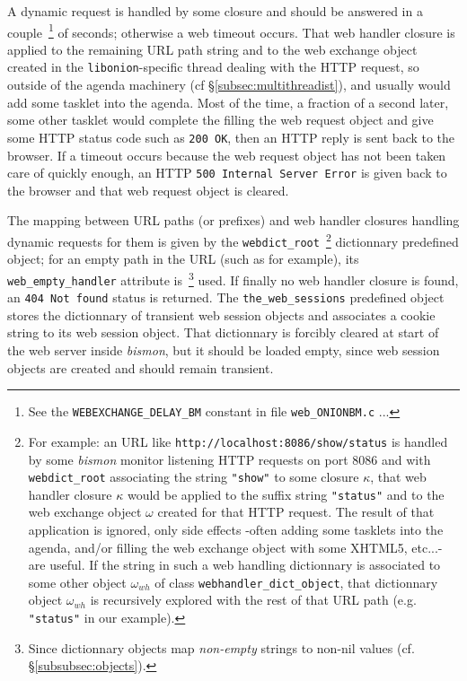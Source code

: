 A dynamic request is handled by some closure  and
should be answered in a couple~\footnote{See the
  \texttt{WEBEXCHANGE\_DELAY\_BM} constant in file
  \texttt{web\_ONIONBM.c} ...} of seconds; otherwise a  web timeout  occurs. That web handler
 closure is applied to the remaining URL path
string and to the web exchange object created in the
\texttt{libonion}-specific thread dealing with the HTTP request, so
outside of the agenda machinery (cf §\ref{subsec:multithreadist}), and
usually would add some  tasklet into the 
agenda. Most of the time, a fraction of a second later, some other
tasklet would complete the filling the web request object and give
some HTTP status code such as \texttt{200 OK}, then an HTTP reply is
sent back to the browser. If a timeout occurs because the web request
object has not been taken care of quickly enough, an HTTP \texttt{500
  Internal Server Error} is given back to the browser and that web
request object is cleared.

The mapping between URL paths (or prefixes) and web handler closures
handling dynamic requests for them is given by the
\texttt{webdict\_root}~\footnote{For example: an URL like
  \texttt{http://localhost:8086/show/status} is handled by some
  \emph{bismon} monitor listening HTTP requests on port 8086 and with
  \texttt{webdict\_root} associating the string \texttt{"show"} to
  some closure $\kappa$, that web handler closure $\kappa$ would be
  applied to the suffix string \texttt{"status"} and to the web
  exchange object $\omega$ created for that HTTP request. The result
  of that application is ignored, only side effects -often adding some
  tasklets into the agenda, and/or filling the web exchange object
  with some XHTML5, etc...- are useful. If the string in such a web
  handling dictionnary is associated to some other object
  $\omega_{wh}$ of class \texttt{webhandler\_dict\_object}, that
  dictionnary object $\omega_{wh}$ is recursively explored with the
  rest of that URL path (e.g. \texttt{"status"} in our example).}
dictionnary predefined object; for an empty path in the URL (such as
{} for example), its
\texttt{web\_empty\_handler} attribute is~\footnote{Since dictionnary
  objects map \emph{non-empty} strings to non-nil values
  (cf. §\ref{subsubsec:objects}).} used.  If finally no web handler
closure is found, an \texttt{404 Not found} status is returned. The
\texttt{the\_web\_sessions} predefined object stores the dictionnary
of transient web session objects and associates a cookie string to its
web session object. That dictionnary is forcibly cleared at start of
the web server inside \emph{bismon}, but it should be loaded empty,
since web session objects are created and should remain transient.

